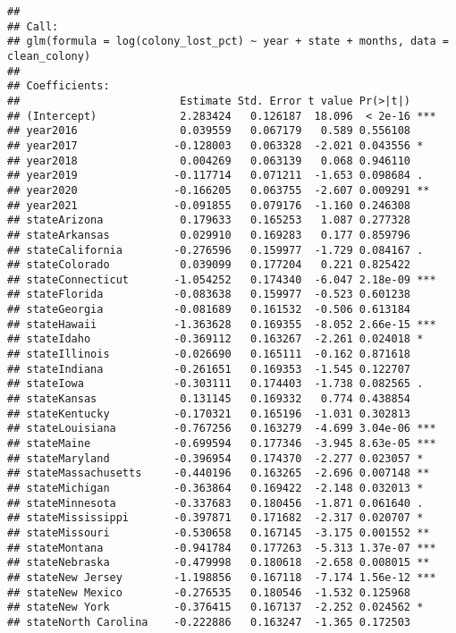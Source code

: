 \documentclass[
]{article}
\begin{document}
\begin{verbatim}
## 
## Call:
## glm(formula = log(colony_lost_pct) ~ year + state + months, data = clean_colony)
## 
## Coefficients:
##                         Estimate Std. Error t value Pr(>|t|)    
## (Intercept)             2.283424   0.126187  18.096  < 2e-16 ***
## year2016                0.039559   0.067179   0.589 0.556108    
## year2017               -0.128003   0.063328  -2.021 0.043556 *  
## year2018                0.004269   0.063139   0.068 0.946110    
## year2019               -0.117714   0.071211  -1.653 0.098684 .  
## year2020               -0.166205   0.063755  -2.607 0.009291 ** 
## year2021               -0.091855   0.079176  -1.160 0.246308    
## stateArizona            0.179633   0.165253   1.087 0.277328    
## stateArkansas           0.029910   0.169283   0.177 0.859796    
## stateCalifornia        -0.276596   0.159977  -1.729 0.084167 .  
## stateColorado           0.039099   0.177204   0.221 0.825422    
## stateConnecticut       -1.054252   0.174340  -6.047 2.18e-09 ***
## stateFlorida           -0.083638   0.159977  -0.523 0.601238    
## stateGeorgia           -0.081689   0.161532  -0.506 0.613184    
## stateHawaii            -1.363628   0.169355  -8.052 2.66e-15 ***
## stateIdaho             -0.369112   0.163267  -2.261 0.024018 *  
## stateIllinois          -0.026690   0.165111  -0.162 0.871618    
## stateIndiana           -0.261651   0.169353  -1.545 0.122707    
## stateIowa              -0.303111   0.174403  -1.738 0.082565 .  
## stateKansas             0.131145   0.169332   0.774 0.438854    
## stateKentucky          -0.170321   0.165196  -1.031 0.302813    
## stateLouisiana         -0.767256   0.163279  -4.699 3.04e-06 ***
## stateMaine             -0.699594   0.177346  -3.945 8.63e-05 ***
## stateMaryland          -0.396954   0.174370  -2.277 0.023057 *  
## stateMassachusetts     -0.440196   0.163265  -2.696 0.007148 ** 
## stateMichigan          -0.363864   0.169422  -2.148 0.032013 *  
## stateMinnesota         -0.337683   0.180456  -1.871 0.061640 .  
## stateMississippi       -0.397871   0.171682  -2.317 0.020707 *  
## stateMissouri          -0.530658   0.167145  -3.175 0.001552 ** 
## stateMontana           -0.941784   0.177263  -5.313 1.37e-07 ***
## stateNebraska          -0.479998   0.180618  -2.658 0.008015 ** 
## stateNew Jersey        -1.198856   0.167118  -7.174 1.56e-12 ***
## stateNew Mexico        -0.276535   0.180546  -1.532 0.125968    
## stateNew York          -0.376415   0.167137  -2.252 0.024562 *  
## stateNorth Carolina    -0.222886   0.163247  -1.365 0.172503    

\end{verbatim}
\end{document}
